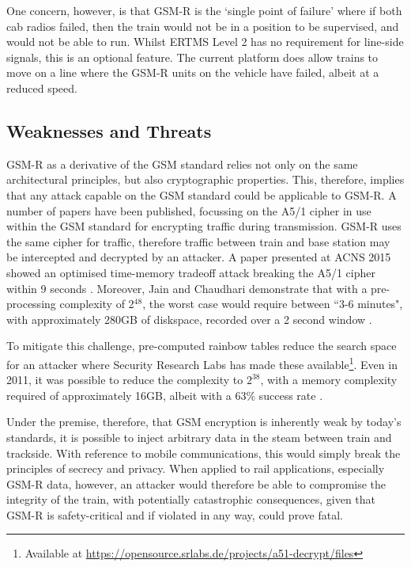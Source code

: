 \documentclass[twoside,11pt,a4paper]{article}
\begin{document}
One concern, however, is that GSM-R is the `single point of failure' where if both cab radios failed, then the train would not be in a position to be supervised, and would not be able to run. Whilst ERTMS Level 2 has no requirement for line-side signals, this is an optional feature. The current platform does allow trains to move on a line where the GSM-R units on the vehicle have failed, albeit at a reduced speed.

\subsection{Weaknesses and Threats}
GSM-R as a derivative of the GSM standard relies not only on the same architectural principles, but also cryptographic properties. This, therefore, implies that any attack capable on the GSM standard could be applicable to GSM-R. A number of papers have been published, focussing on the A5/1 cipher in use within the GSM standard for encrypting traffic during transmission. GSM-R uses the same cipher for traffic, therefore traffic between train and base station may be intercepted and decrypted by an attacker. A paper presented at ACNS 2015 showed an optimised time-memory tradeoff attack breaking the A5/1 cipher within 9 seconds \citep{ACNS15a}. Moreover, Jain and Chaudhari demonstrate that with a pre-processing complexity of 2$^{48}$, the worst case would require between ``3-6 minutes", with approximately 280GB of diskspace, recorded over a 2 second window \citep{Arxiv13a}.

To mitigate this challenge, pre-computed rainbow tables reduce the search space for an attacker where Security Research Labs has made these available\footnote{Available at \url{https://opensource.srlabs.de/projects/a51-decrypt/files}}. Even in 2011, it was possible to reduce the complexity to $2^{38}$, with a memory complexity required of approximately 16GB, albeit with a 63\% success rate \citep{6062339}.

Under the premise, therefore, that GSM encryption is inherently weak by today's standards, it is possible to inject arbitrary data in the steam between train and trackside. With reference to mobile communications, this would simply break the principles of secrecy and privacy. When applied to rail applications, especially GSM-R data, however, an attacker would therefore be able to compromise the integrity of the train, with potentially catastrophic consequences, given that GSM-R is safety-critical and if violated in any way, could prove fatal.
\end{document}
